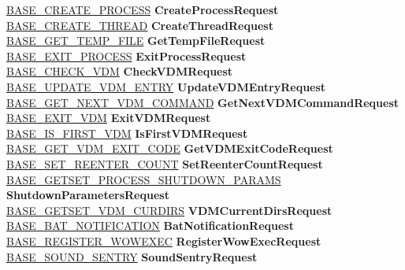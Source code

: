 \begin{DoxyCompactItemize}
\begin{tabbing}
\>\hyperlink{struct___b_a_s_e___c_r_e_a_t_e___p_r_o_c_e_s_s}{BASE\_CREATE\_PROCESS} {\bfseries CreateProcessRequest}\\
\>\hyperlink{struct___b_a_s_e___c_r_e_a_t_e___t_h_r_e_a_d}{BASE\_CREATE\_THREAD} {\bfseries CreateThreadRequest}\\
\>\hyperlink{struct___b_a_s_e___g_e_t___t_e_m_p___f_i_l_e}{BASE\_GET\_TEMP\_FILE} {\bfseries GetTempFileRequest}\\
\>\hyperlink{struct___b_a_s_e___e_x_i_t___p_r_o_c_e_s_s}{BASE\_EXIT\_PROCESS} {\bfseries ExitProcessRequest}\\
\>\hyperlink{struct___b_a_s_e___c_h_e_c_k___v_d_m}{BASE\_CHECK\_VDM} {\bfseries CheckVDMRequest}\\
\>\hyperlink{struct___b_a_s_e___u_p_d_a_t_e___v_d_m___e_n_t_r_y}{BASE\_UPDATE\_VDM\_ENTRY} {\bfseries UpdateVDMEntryRequest}\\
\>\hyperlink{struct___b_a_s_e___g_e_t___n_e_x_t___v_d_m___c_o_m_m_a_n_d}{BASE\_GET\_NEXT\_VDM\_COMMAND} {\bfseries GetNextVDMCommandRequest}\\
\>\hyperlink{struct___b_a_s_e___e_x_i_t___v_d_m}{BASE\_EXIT\_VDM} {\bfseries ExitVDMRequest}\\
\>\hyperlink{struct___b_a_s_e___i_s___f_i_r_s_t___v_d_m}{BASE\_IS\_FIRST\_VDM} {\bfseries IsFirstVDMRequest}\\
\>\hyperlink{struct___b_a_s_e___g_e_t___v_d_m___e_x_i_t___c_o_d_e}{BASE\_GET\_VDM\_EXIT\_CODE} {\bfseries GetVDMExitCodeRequest}\\
\>\hyperlink{struct___b_a_s_e___s_e_t___r_e_e_n_t_e_r___c_o_u_n_t}{BASE\_SET\_REENTER\_COUNT} {\bfseries SetReenterCountRequest}\\
\>\hyperlink{struct___b_a_s_e___g_e_t_s_e_t___p_r_o_c_e_s_s___s_h_u_t_d_o_w_n___p_a_r_a_m_s}{BASE\_GETSET\_PROCESS\_SHUTDOWN\_PARAMS} {\bfseries ShutdownParametersRequest}\\
\>\hyperlink{struct___b_a_s_e___g_e_t_s_e_t___v_d_m___c_u_r_d_i_r_s}{BASE\_GETSET\_VDM\_CURDIRS} {\bfseries VDMCurrentDirsRequest}\\
\>\hyperlink{struct___b_a_s_e___b_a_t___n_o_t_i_f_i_c_a_t_i_o_n}{BASE\_BAT\_NOTIFICATION} {\bfseries BatNotificationRequest}\\
\>\hyperlink{struct___b_a_s_e___r_e_g_i_s_t_e_r___w_o_w_e_x_e_c}{BASE\_REGISTER\_WOWEXEC} {\bfseries RegisterWowExecRequest}\\
\>\hyperlink{struct___b_a_s_e___s_o_u_n_d___s_e_n_t_r_y}{BASE\_SOUND\_SENTRY} {\bfseries SoundSentryRequest}\\

\end{tabbing}
\end{DoxyCompactItemize}
